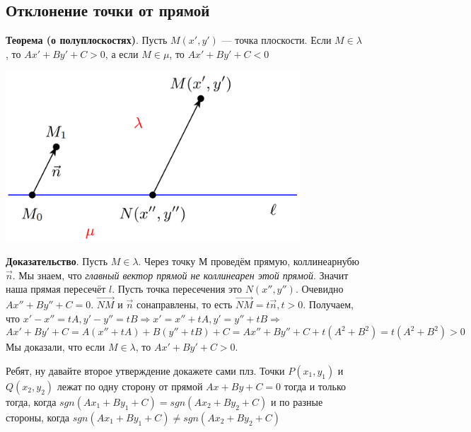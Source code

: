 \documentclass[a4paper]{article}
\begin{document}
    \subsection*{Отклонение точки от прямой}

    \begin{htheorem}
        \textbf{Теорема (о полуплоскостях)}. Пусть $M(x', y')$ --- точка плоскости. Если $M \in \lambda$, то $Ax' + By' + C > 0$, а если $M \in \mu $, то $Ax' + By' + C < 0$
    \end{htheorem}



    \includegraphics[width=11cm]{t7}

    \begin{hproof}
        \textbf{Доказательство}. Пусть $M \in \lambda$. Через точку М проведём прямую, коллинеарнубю $\vec{n}$. Мы знаем, что \textit{главный вектор прямой не коллинеарен этой прямой}. Значит наша прямая пересечёт $l$. Пусть точка пересечения это $N(x'', y'')$. Очевидно $Ax'' + By'' + C = 0$. $\overrightarrow{NM}$ и $\vec{n}$ сонаправлены, то есть $\overrightarrow{NM} = t \vec{n}, t>0$. Получаем, что $x' -x'' = tA, y'-y'' = tB \Rightarrow x' = x'' + tA, y' = y'' + tB \Rightarrow$ \newline \begin{equation}
                                                                                                                                                                                                                                                                                                                                                                                                                                                                                                                  Ax' + By' + C = A(x'' + tA) + B(y'' + tB) + C = Ax'' + By'' + C + t(A^2 + B^2) = t(A^2+B^2)>0
        \end{equation}
        Мы доказали, что если $M \in \lambda$, то $Ax' + By' + C > 0$.

        Ребят, ну давайте второе утверждение докажете сами плз.
        \newline
        Точки $P(x_1, y_1)$ и $Q(x_2, y_2)$ лежат по одну сторону от прямой $Ax+By+C=0$ тогда и только тогда, когда $sgn (Ax_1+By_1+C) = sgn (Ax_2+By_2+C)$ и по разные стороны, когда $sgn (Ax_1+By_1+C) \neq sgn (Ax_2+By_2+C)$
    \end{hproof}
\end{document}
